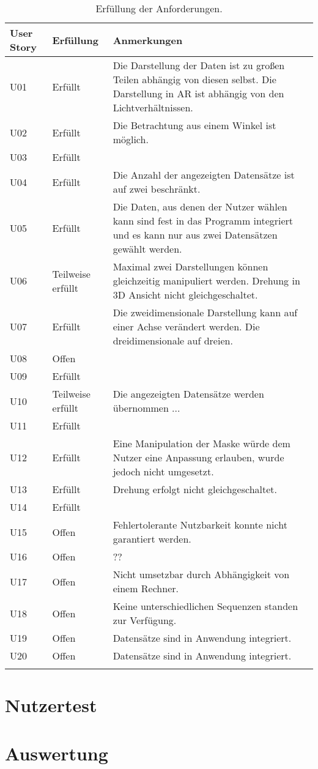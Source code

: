 \begin{longtable} {p{}p{}p{}}
\toprule
User Story & Erfüllung & Anmerkungen \\
\toprule
U01 & Erfüllt & Die Darstellung der Daten ist zu großen Teilen abhängig von diesen selbst. Die Darstellung in AR ist abhängig von den Lichtverhältnissen.\\
\midrule 
U02 & Erfüllt & Die Betrachtung aus einem Winkel ist möglich.\\
\midrule 
U03 & Erfüllt & \\
\midrule 
U04 & Erfüllt & Die Anzahl der angezeigten Datensätze ist auf zwei beschränkt.\\
\midrule 
U05 & Erfüllt & Die Daten, aus denen der Nutzer wählen kann sind fest in das Programm integriert und es kann nur aus zwei Datensätzen gewählt werden.\\
\midrule
U06 & Teilweise erfüllt & Maximal zwei Darstellungen können gleichzeitig manipuliert werden. Drehung in 3D Ansicht nicht gleichgeschaltet.\\
\midrule 
U07 & Erfüllt & Die zweidimensionale Darstellung kann auf einer Achse verändert werden. Die dreidimensionale auf dreien.\\
\midrule 
U08 & Offen & \\
\midrule 
U09 & Erfüllt & \\
\midrule 
U10 & Teilweise erfüllt & Die angezeigten Datensätze werden übernommen ...\\
\midrule 
U11  & Erfüllt & \\
\midrule
U12 & Erfüllt & Eine Manipulation der Maske würde dem Nutzer eine Anpassung erlauben, wurde jedoch nicht umgesetzt.\\
\midrule 
U13 & Erfüllt & Drehung erfolgt nicht gleichgeschaltet.\\
\midrule 
U14 & Erfüllt & \\
\midrule 
U15 & Offen & Fehlertolerante Nutzbarkeit konnte nicht garantiert werden.\\
\midrule 
U16 & Offen & ??\\
\midrule 
U17 & Offen & Nicht umsetzbar durch Abhängigkeit von einem Rechner.\\
\midrule 
U18 & Offen & Keine unterschiedlichen Sequenzen standen zur Verfügung.\\
\midrule 
U19 & Offen & Datensätze sind in Anwendung integriert.\\
\midrule 
U20 & Offen & Datensätze sind in Anwendung integriert.\\

\bottomrule
\caption{\label{tab:evaluation}Erfüllung der Anforderungen.}
\end{longtable}

\section{Nutzertest}

\section{Auswertung}

